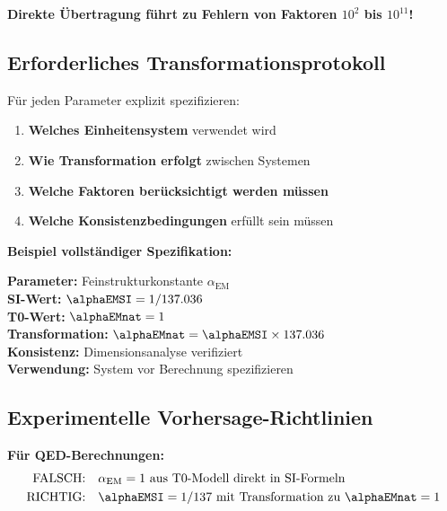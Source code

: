 	\textbf{Direkte Übertragung führt zu Fehlern von Faktoren $10^2$ bis $10^{11}$!}
	
	\subsection{Erforderliches Transformationsprotokoll}
	\label{subsec:transformationsprotokoll}
	
	Für jeden Parameter explizit spezifizieren:
	
	\begin{enumerate}
		\item \textbf{Welches Einheitensystem} verwendet wird
		\item \textbf{Wie Transformation erfolgt} zwischen Systemen
		\item \textbf{Welche Faktoren berücksichtigt werden müssen}
		\item \textbf{Welche Konsistenzbedingungen} erfüllt sein müssen
	\end{enumerate}
	
	\textbf{Beispiel vollständiger Spezifikation:}
	\begin{tcolorbox}[colback=red!5!white,colframe=red!75!black,title=Parameter-Spezifikationsvorlage]
		\textbf{Parameter:} Feinstrukturkonstante $\alpha_{\text{EM}}$ \\
		\textbf{SI-Wert:} $\alphaEMSI = 1/137.036$ \\
		\textbf{T0-Wert:} $\alphaEMnat = 1$ \\
		\textbf{Transformation:} $\alphaEMnat = \alphaEMSI \times 137.036$ \\
		\textbf{Konsistenz:} Dimensionsanalyse verifiziert \\
		\textbf{Verwendung:} System vor Berechnung spezifizieren
	\end{tcolorbox}
	
	\subsection{Experimentelle Vorhersage-Richtlinien}
	\label{subsec:experimentelle_richtlinien}
	
	\textbf{Für QED-Berechnungen:}
	\begin{align}
		\text{FALSCH:} \quad &\alpha_{\text{EM}} = 1 \text{ aus T0-Modell direkt in SI-Formeln} \\
		\text{RICHTIG:} \quad &\alphaEMSI = 1/137 \text{ mit Transformation zu } \alphaEMnat = 1
	\end{align}
	
